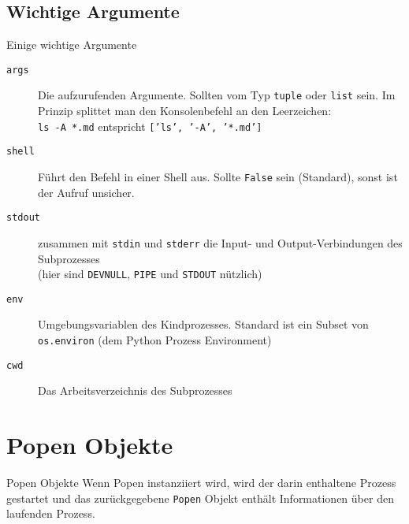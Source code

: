 \subsection{Wichtige Argumente}
\begin{frame}[fragile]{Einige wichtige Argumente}
	\begin{description}
		\item[\texttt{args}] Die aufzurufenden Argumente. Sollten vom Typ
			\texttt{tuple} oder \texttt{list} sein. Im Prinzip splittet man den
			Konsolenbefehl an den Leerzeichen: \\
			\texttt{ls -A *.md} entspricht \texttt{['ls', '-A', '*.md']}
		\item[\texttt{shell}] F\"uhrt den Befehl in einer Shell aus.
			Sollte \texttt{False} sein (Standard), sonst ist der Aufruf unsicher.
		\item[\texttt{stdout}] zusammen mit \texttt{stdin} und \texttt{stderr} die Input- und
			Output-Verbindungen des Subprozesses \\
			(hier sind \texttt{DEVNULL}, \texttt{PIPE} und \texttt{STDOUT} n\"utzlich)
		\item[\texttt{env}] Umgebungsvariablen des Kindprozesses. Standard ist ein
			Subset von \texttt{os.environ} (dem Python Prozess Environment)
		\item[\texttt{cwd}] Das Arbeitsverzeichnis des Subprozesses
	\end{description}
\end{frame}


\section{Popen Objekte}
\begin{frame}{Popen Objekte}
	Wenn Popen instanziiert wird, wird der darin enthaltene Prozess gestartet und
	das zurückgegebene \texttt{Popen} Objekt enth\"alt Informationen \"uber den
	laufenden Prozess.
\end{frame}

